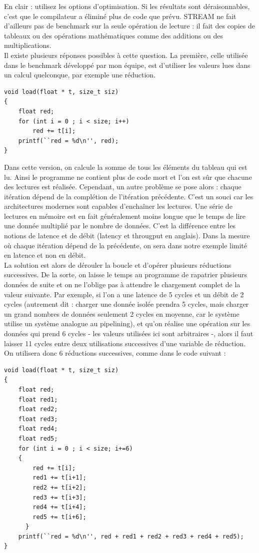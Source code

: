 \documentclass{report}
\begin{document}
En clair : utilisez les options d'optimisation. Si les résultats sont déraisonnables, c'est que le 
compilateur a éliminé plus de code que prévu. STREAM ne fait d'ailleurs pas de benchmark sur la seule
opération de lecture : il fait des copies de tableaux ou des opérations mathématiques comme des additions
ou des multiplications.
\\Il existe plusieurs réponses possibles à cette question. La première, celle utilisée dans le benchmark
développé par mon équipe, est d'utiliser les valeurs lues dans un calcul quelconque, par exemple une 
réduction.
\begin{lstlisting}
void load(float * t, size_t siz)
{
    float red;
    for (int i = 0 ; i < size; i++)
        red += t[i]; 
    printf(``red = %d\n'', red); 
}
\end{lstlisting}
Dans cette version, on calcule la somme de tous les éléments du tableau qui est lu. Ainsi le programme
ne contient plus de code mort et l'on est sûr que chacune des lectures est réalisée. Cependant, un autre
problème se pose alors : chaque itération dépend de la complétion de l'itération précédente. C'est un souci
car les architectures modernes sont capables d'enchaîner les lectures. Une série de lectures
en mémoire est en fait généralement moins longue que le temps de lire une donnée multiplié par le nombre
de données. C'est la différence entre les notions de latence et de débit (latency et througput en 
anglais). Dans la mesure où chaque itération dépend de la précédente, on sera dans notre exemple
limité en latence et non en débit.
\\La solution est alors de dérouler la boucle et d'opérer plusieurs réductions successives. De la
sorte, on laisse le temps au programme de rapatrier plusieurs données de suite et on ne l'oblige pas
à attendre le chargement complet de la valeur suivante. Par exemple, si l'on a une latence de 5 cycles
et un débit de 2 cycles (autrement dit : charger une donnée isolée prendra 5 cycles, mais charger un grand
nombres de données seulement 2 cycles en moyenne, car le système utilise un système analogue au 
pipelining), et qu'on réalise une opération sur les données qui prend 6 cycles - les valeurs utilisées
ici sont arbitraires -, alors il faut laisser 11 cycles entre deux utilisations successives d'une 
variable de réduction. On utilisera donc 6 réductions successives, comme dans le code suivant :
\begin{lstlisting}
void load(float * t, size_t siz)
{
    float red;
    float red1;
    float red2;
    float red3;
    float red4;
    float red5;
    for (int i = 0 ; i < size; i+=6)
    {
        red += t[i]; 
        red1 += t[i+1]; 
        red2 += t[i+2]; 
        red3 += t[i+3]; 
        red4 += t[i+4]; 
        red5 += t[i+6]; 
      }
    printf(``red = %d\n'', red + red1 + red2 + red3 + red4 + red5); 
}
\end{lstlisting}
\end{document}
